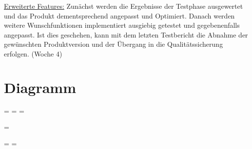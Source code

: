 \underline{Erweiterte Features:} Zunächst werden die Ergebnisse der Testphase ausgewertet und das Produkt dementsprechend angepasst und Optimiert. Danach werden weitere Wunschfunktionen implementiert ausgiebig getestet und gegebenenfalls angepasst. Ist dies geschehen, kann mit dem letzten Testbericht die Abnahme der gewünschten Produktversion und der Übergang in die Qualitätssicherung erfolgen. (Woche 4)



\section{Diagramm}

\newpage

\paperwidth=\pdfpageheight
{}\pdfpagewidth
\pdfpageheight=\paperheight
\pdfpagewidth=\paperwidth
{}\textheight

\begingroup 
\vsize=\textwidth
{}\textheight

\textwidth=\hsize
\textheight=\vsize



